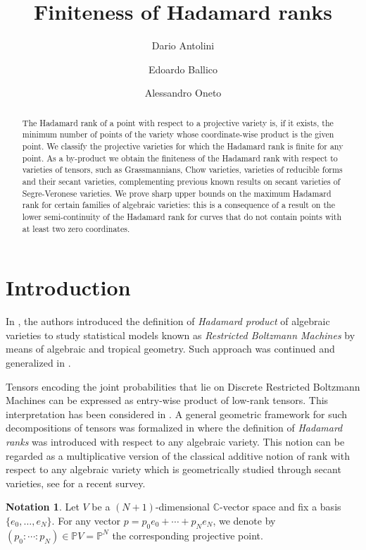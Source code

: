 \documentclass{amsart}
\title{Finiteness of Hadamard ranks}
\author{Dario Antolini}
\author{Edoardo Ballico}
\author{Alessandro Oneto}
\theoremstyle{plain}
\numberwithin{theorem}{section}
\theoremstyle{definition}
\newtheorem*{notation}{Notation}
\newcommand{\bbC}{\mathbb{C}}
\newcommand{\bbP}{\mathbb{P}}
\begin{document}
\begin{abstract} 
    The Hadamard rank of a point with respect to a projective variety is, if it exists, the minimum number of points of the variety whose coordinate-wise product is the given point. We classify the projective varieties for which the Hadamard rank is finite for any point. As a by-product we obtain the finiteness of the Hadamard rank with respect to varieties of tensors, such as Grassmannians, Chow varieties, varieties of reducible forms and their secant varieties, complementing previous known results on secant varieties of Segre-Veronese varieties. We prove sharp upper bounds on the maximum Hadamard rank for certain families of algebraic varieties: this is a consequence of a result on the lower semi-continuity of the Hadamard rank for curves that do not contain points with at least two zero coordinates.
\end{abstract}

\maketitle

\section{Introduction}
In \cite{CMS10:GeometryRBM}, the authors introduced the definition of \textit{Hadamard product} of algebraic varieties to study statistical models known as \textit{Restricted Boltzmann Machines} by means of algebraic and tropical geometry. Such approach was continued and generalized in \cite{CTY10:Implicitization,montufar2015discrete,montufar2018restricted}. 

Tensors encoding the joint probabilities that lie on Discrete Restricted Boltzmann Machines can be expressed as entry-wise product of low-rank tensors. This interpretation has been considered in \cite{seigal2018mixtures,oneto2023hadamard}. A general geometric framework for such decompositions of tensors was formalized in \cite{hadamardranks} where the definition of \textit{Hadamard ranks} was introduced with respect to any algebraic variety. This notion can be regarded as a multiplicative version of the classical additive notion of rank with respect to any algebraic variety which is geometrically studied through secant varieties, see \cite{oneto2025ranks} for a recent survey.

\begin{notation}
    Let $V$ be a $(N+1)$-dimensional $\bbC$-vector space and fix a basis $\{e_0,\ldots,e_N\}$. For any vector $p = p_0e_0 +\cdots + p_Ne_N$, we denote by $(p_0:\cdots:p_N)\in\bbP V = \bbP^N$ the corresponding projective point.     
\end{notation}
\end{document}
